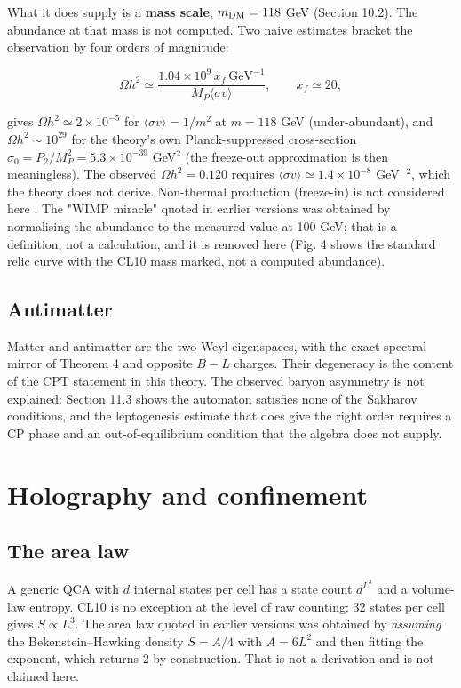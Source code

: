 \documentclass[aps,prd,amsmath,amssymb,superscriptaddress,longbibliography,floatfix,preprint]{revtex4-2}
\begin{document}
What it does supply is a \textbf{mass scale}, $m_{\rm DM} = 118$ GeV (Section 10.2). The abundance at that mass is not computed. Two naive estimates \cite{ref41} bracket the observation by four orders of magnitude:

\[\Omega h^2 \simeq \frac{1.04\times10^9\, x_f\ \mathrm{GeV}^{-1}}{M_P\langle\sigma v\rangle},\qquad x_f \simeq 20,\]

gives $\Omega h^2 \simeq 2\times10^{-5}$ for $\langle\sigma v\rangle = 1/m^2$ at $m = 118$ GeV (under-abundant), and $\Omega h^2 \sim 10^{29}$ for the theory's own Planck-suppressed cross-section $\sigma_0 = P_2/M_P^2 = 5.3\times10^{-39}$ GeV$^2$ (the freeze-out approximation is then meaningless). The observed $\Omega h^2 = 0.120$ requires $\langle\sigma v\rangle \simeq 1.4\times10^{-8}$ GeV$^{-2}$, which the theory does not derive. Non-thermal production (freeze-in) is not considered here \cite{ref42}. The "WIMP miracle" quoted in earlier versions was obtained by normalising the abundance to the measured value at 100 GeV; that is a definition, not a calculation, and it is removed here (Fig. 4 shows the standard relic curve with the CL10 mass marked, not a computed abundance).

\subsection{Antimatter}

Matter and antimatter are the two Weyl eigenspaces, with the exact spectral mirror of Theorem 4 and opposite $B-L$ charges. Their degeneracy is the content of the CPT statement in this theory. The observed baryon asymmetry is not explained: Section 11.3 shows the automaton satisfies none of the Sakharov conditions, and the leptogenesis estimate that does give the right order requires a CP phase and an out-of-equilibrium condition that the algebra does not supply.

\section{Holography and confinement}

\subsection{The area law}

A generic QCA with $d$ internal states per cell has a state count $d^{L^3}$ and a volume-law entropy. CL10 is no exception at the level of raw counting: 32 states per cell gives $S \propto L^3$. The area law quoted in earlier versions was obtained by \emph{assuming} the Bekenstein--Hawking \cite{ref35} density $S = A/4$ with $A = 6L^2$ and then fitting the exponent, which returns $2$ by construction. That is not a derivation and is not claimed here.
\end{document}
